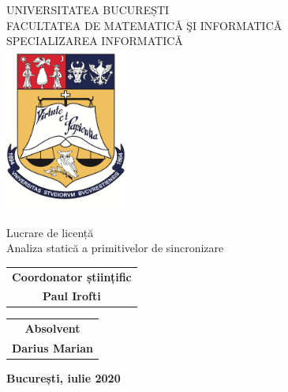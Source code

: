 \begin{titlepage}
    \begin{center}
        \Large
        UNIVERSITATEA BUCUREȘTI
        \\FACULTATEA DE MATEMATICǍ ŞI INFORMATICǍ
        \\SPECIALIZAREA INFORMATICǍ
        \vspace*{0.5cm}
        \\\includegraphics[width=4cm]{resources/blazon.png}

        \vspace*{2cm}
        \LARGE Lucrare de licență
        \\\huge Analiza statică a primitivelor de sincronizare
        
        \vfill
    \end{center}
    \large
    \hspace*{1.5cm}
    \begin{tabular}{c@{}}
        \textbf{Coordonator științific} \\
        \textbf{Paul Irofti}
    \end{tabular}
    \hfill
    \begin{tabular}{c@{}}
        \textbf{Absolvent} \\
        \textbf{Darius Marian}
    \end{tabular}
    \hspace*{1.5cm}
    \vspace*{1.5cm}
    \begin{center}
        \textbf{București, iulie 2020}
    \end{center}
\end{titlepage}